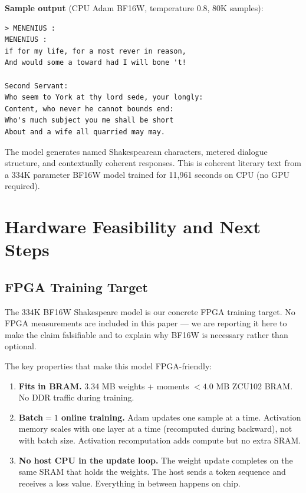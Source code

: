 \documentclass[11pt]{article}
\begin{document}
\textbf{Sample output} (CPU Adam BF16W, temperature 0.8, 80K samples):
\begin{lstlisting}
> MENENIUS :
MENENIUS :
if for my life, for a most rever in reason,
And would some a toward had I will bone 't!

Second Servant:
Who seem to York at thy lord sede, your longly:
Content, who never he cannot bounds end:
Who's much subject you me shall be short
About and a wife all quarried may may.
\end{lstlisting}

The model generates named Shakespearean characters, metered dialogue structure, and
contextually coherent responses. This is coherent literary text from a 334K parameter
BF16W model trained for 11,961 seconds on CPU (no GPU required).

\section{Hardware Feasibility and Next Steps}

\label{sec:future}

\subsection{FPGA Training Target}

The 334K BF16W Shakespeare model is our concrete FPGA training target. No FPGA
measurements are included in this paper --- we are reporting it here to make the
claim falsifiable and to explain why BF16W is necessary rather than optional.

The key properties that make this model FPGA-friendly:

\begin{enumerate}
  \item \textbf{Fits in BRAM.} 3.34 MB weights + moments $< 4.0$ MB ZCU102 BRAM.
    No DDR traffic during training.
  \item \textbf{Batch$=1$ online training.} Adam updates one sample at a time.
    Activation memory scales with one layer at a time (recomputed during backward),
    not with batch size. Activation recomputation adds compute but no extra SRAM.
  \item \textbf{No host CPU in the update loop.} The weight update completes on the
    same SRAM that holds the weights. The host sends a token sequence and receives
    a loss value. Everything in between happens on chip.
\end{enumerate}
\end{document}

